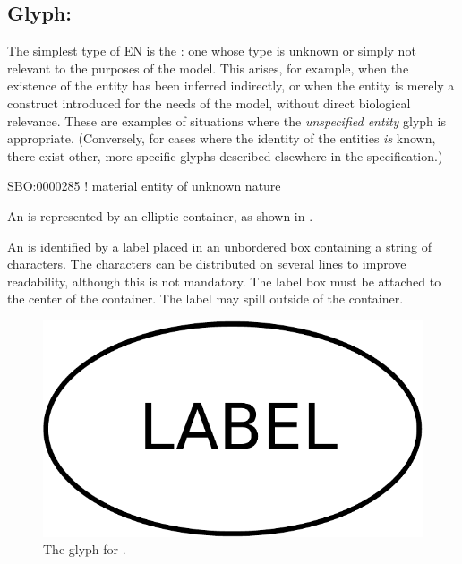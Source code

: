 
\color{red}

\subsection{Glyph: }
\label{sec:unspecifiedEntity}

The simplest type of EN is the : one whose type is unknown or simply not relevant to the purposes of the model.  This arises, for example, when the existence of the entity has been inferred indirectly, or when the entity is merely a construct introduced for the needs of the model, without direct biological relevance.  These are examples of situations where the \emph{unspecified entity} glyph is appropriate.  (Conversely, for cases where the identity of the entities \emph{is} known, there exist other, more specific glyphs described elsewhere in the \SBGNERLone specification.)

\begin{glyphDescription}

\glyphSboTerm SBO:0000285 ! material entity of unknown nature 

\glyphContainer An  is represented by an elliptic container, as shown in .

\glyphLabel An  is identified by a label placed in an unbordered box containing a string of characters.  The characters can be distributed on several lines to improve readability, although this is not mandatory.  The label box must be attached to the center of the container.  The label may spill outside of the container.

\end{glyphDescription}

\begin{figure}[H]
  \centering
  \includegraphics[scale = 0.3]{images/unspecified}
  \caption{The \ER glyph for .}
  \label{fig:unspecified}
\end{figure}

\normalcolor

